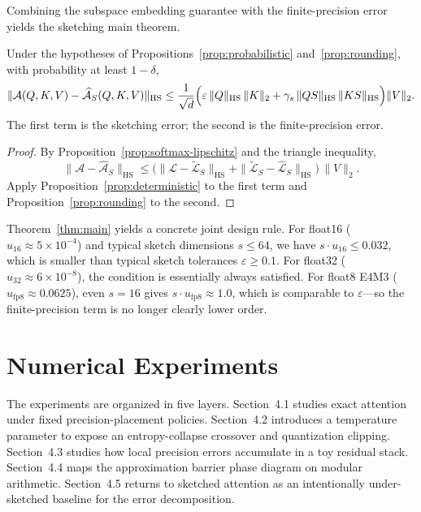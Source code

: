 Combining the subspace embedding guarantee with the finite-precision error yields the sketching main theorem.

\begin{theorem}
    \label{thm:main}
    Under the hypotheses of Propositions~\ref{prop:probabilistic} and~\ref{prop:rounding}, with probability at least $1-\delta$,
    \[
        \|\mathcal{A}(Q,K,V) - \widehat{\mathcal{A}}_S(Q,K,V)\|_{\mathrm{HS}}
        \leq
        \frac{1}{\sqrt{d}}
        \Bigl(
            \varepsilon\, \|Q\|_{\mathrm{HS}}\,\|K\|_2
            +
            \gamma_s\, \|QS\|_{\mathrm{HS}}\,\|KS\|_{\mathrm{HS}}
        \Bigr)
        \|V\|_2.
    \]
    The first term is the sketching error; the second is the finite-precision error.
\end{theorem}

\begin{proof}
    By Proposition~\ref{prop:softmax-lipschitz} and the triangle inequality,
    \[
        \|\mathcal{A} - \widehat{\mathcal{A}}_S\|_{\mathrm{HS}}
        \leq
        \bigl(\|\mathcal{L} - \widetilde{\mathcal{L}}_S\|_{\mathrm{HS}} + \|\widetilde{\mathcal{L}}_S - \widehat{\mathcal{L}}_S\|_{\mathrm{HS}}\bigr)\,\|V\|_2.
    \]
    Apply Proposition~\ref{prop:deterministic} to the first term and Proposition~\ref{prop:rounding} to the second.
\end{proof}

\begin{remark}
    \label{rem:sketch-rule}
    Theorem~\ref{thm:main} yields a concrete joint design rule. For float16 ($u_{16} \approx 5 \times 10^{-4}$) and typical sketch dimensions $s \leq 64$, we have $s \cdot u_{16} \leq 0.032$, which is smaller than typical sketch tolerances $\varepsilon \geq 0.1$. For float32 ($u_{32} \approx 6 \times 10^{-8}$), the condition is essentially always satisfied. For float8 E4M3 ($u_{\text{fp8}} \approx 0.0625$), even $s = 16$ gives $s \cdot u_{\text{fp8}} \approx 1.0$, which is comparable to $\varepsilon$---so the finite-precision term is no longer clearly lower order.
\end{remark}

\section{Numerical Experiments}

The experiments are organized in five layers. Section~4.1 studies exact attention under fixed precision-placement policies. Section~4.2 introduces a temperature parameter to expose an entropy-collapse crossover and quantization clipping. Section~4.3 studies how local precision errors accumulate in a toy residual stack. Section~4.4 maps the approximation barrier phase diagram on modular arithmetic. Section~4.5 returns to sketched attention as an intentionally under-sketched baseline for the error decomposition.

